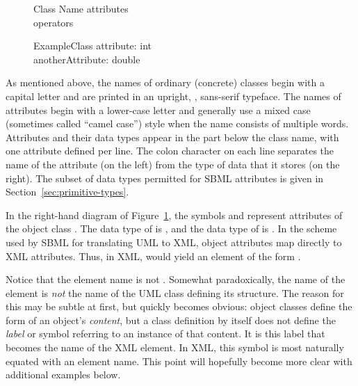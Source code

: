 \begin{blockChanged}
\begin{figure}[htb]
  \centering
  \small
  \begin{blockChanged}
    \begin{classbox}{Class Name}
      attributes\\
      \hline
      operators\\
    \end{classbox}
    \quad  \quad  \quad  \quad
    \begin{classbox}{ExampleClass}
      attribute: int \\
      anotherAttribute: double\\
    \end{classbox}
  \end{blockChanged}
  \caption{}
  \label{fig:simple-class-eg}
\end{figure}

As mentioned above, the names of ordinary (concrete) classes begin
with a capital letter and are printed in an upright,
, sans-serif typeface.  The names of attributes
begin with a lower-case letter and generally use a mixed case
(sometimes called ``camel case'') style when the name consists of
multiple words.  Attributes and their data types appear in the
part below the class name, with one attribute defined per line.
The colon character on each line separates the name of the
attribute (on the left) from the type of data that it stores (on
the right).  The subset of data types permitted for SBML
attributes is given in Section~\ref{sec:primitive-types}.

In the right-hand diagram of Figure~\ref{fig:simple-class-eg}, the
symbols  and  represent
attributes of the object class .  The data
type of  is , and the data type of
 is .  In the scheme used
by SBML for translating UML to XML, object attributes map directly
to XML attributes.  Thus, in XML,  would yield
an element of the form .

Notice that the element name is not .
Somewhat paradoxically, the name of the element is \emph{not} the
name of the UML class defining its structure.  The reason for this
may be subtle at first, but quickly becomes obvious: object
classes define the form of an object's \emph{content}, but a class
definition by itself does not define the \emph{label} or symbol
referring to an instance of that content.  It is this label that
becomes the name of the XML element.  In XML, this symbol is most
naturally equated with an element name.  This point will hopefully
become more clear with additional examples below.



\end{blockChanged}
